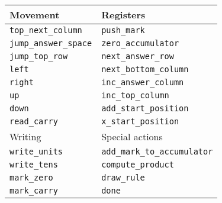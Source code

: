 \begin{slide*}

\begin{center}\small
\begin{tabular}{ll}
Movement                 &  Registers\\\hline
\verb|top_next_column|   &  \verb|push_mark|\\
\verb|jump_answer_space| &  \verb|zero_accumulator|\\
\verb|jump_top_row|      &  \verb|next_answer_row|\\
\verb|left|              &  \verb|next_bottom_column|\\
\verb|right|             &  \verb|inc_answer_column|\\
\verb|up|                &  \verb|inc_top_column|\\
\verb|down|              &  \verb|add_start_position|\\
\verb|read_carry|        &  \verb|x_start_position|\bigskip\\
Writing                  &  Special actions\\\hline
\verb|write_units|       &  \verb|add_mark_to_accumulator|\\
\verb|write_tens|        &  \verb|compute_product|\\
\verb|mark_zero|         &  \verb|draw_rule|\\
\verb|mark_carry|        &  \verb|done|\\
\end{tabular}
\end{center}
\end{slide*}


